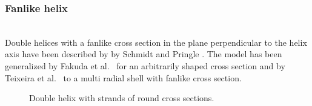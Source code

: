 \subsubsection{Fanlike helix} ~\\
Double helices with a fanlike cross section in the plane perpendicular to the helix axis have been described by by Schmidt and Pringle \cite{Schmidt1970,Pringle1971}. The model has been generalized by Fakuda et al.\ \cite{Fukuda2002} for an arbitrarily shaped cross section and by Teixeira et al.\ \cite{Teixeira2010} to a multi radial shell with fanlike cross section.
\begin{figure}[htb]
\begin{center}
\hfill
\end{center}
\caption{Double helix with strands of round cross sections.} \label{fig:fanhelix}
\end{figure}

